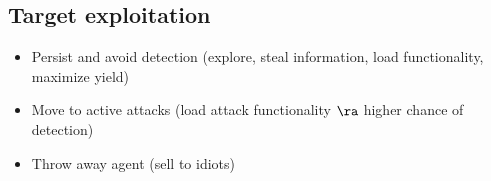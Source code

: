 \documentclass[fs, footer]{latex4ei}
\begin{document}
\begin{multicols*}{4}
{\subsection{Target exploitation}
\begin{itemize}
	\item Persist and avoid detection (explore, steal information, load functionality, maximize yield)
	\item Move to active attacks (load attack functionality $\ra$ higher chance of detection)
	\item Throw away agent (sell to idiots)
\end{itemize}

}  
\end{multicols*}
\end{document}
